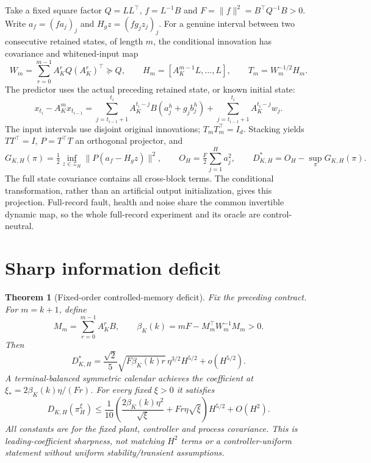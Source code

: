 \documentclass[11pt]{article}
\newtheorem{theorem}{Theorem}
\begin{document}
Take a fixed square factor $Q=LL^\top$, $f=L^{-1}B$ and
$F=\|f\|^2=B^\top Q^{-1}B>0$.
Write $a_f=(f a_j)_j$ and $H_gz=(f g_j z_j)_j$.
For a genuine interval between two consecutive retained states, of length $m$,
the conditional innovation has covariance and whitened-input map
\[
W_m=\sum_{r=0}^{m-1}A_K^rQ(A_K^r)^\top\succeq Q,\qquad
H_m=[A_K^{m-1}L,\ldots,L],\qquad T_m=W_m^{-1/2}H_m .
\]
The predictor uses the actual preceding retained state, or known initial state:
\[
x_{t_i}-A_K^m x_{t_{i-1}}
=\sum_{j=t_{i-1}+1}^{t_i}A_K^{t_i-j}B(a_j^h+g_jb_j^h)
+\sum_{j=t_{i-1}+1}^{t_i}A_K^{t_i-j}w_j .
\]
The input intervals use disjoint original innovations; $T_mT_m^\top=I_d$.
Stacking yields $TT^\top=I$, $P=T^\top T$ an orthogonal projector, and
\[
G_{K,H}(\pi)=\tfrac12\inf_{z\in\mathcal Z_H}\|P(a_f-H_gz)\|^2,\qquad
O_H=\tfrac F2\sum_{j=1}^H a_j^2,\qquad
D_{K,H}^*=O_H-\sup_\pi G_{K,H}(\pi).
\]
The full state covariance contains all cross-block terms. The conditional
transformation, rather than an artificial output initialization, gives this
projection. Full-record fault, health and noise share the common invertible
dynamic map, so the whole full-record experiment and its oracle are
control-neutral.

\section{Sharp information deficit}\begin{theorem}[Fixed-order controlled-memory deficit]\label{thm:main}
Fix the preceding contract. For $m=k+1$, define
\[
M_m=\sum_{r=0}^{m-1}A_K^rB,\qquad
\beta_K(k)=mF-M_m^\top W_m^{-1}M_m>0.
\]
Then
\begin{equation}\label{eq:sharp}
D_{K,H}^*=\frac{\sqrt2}{5}\sqrt{F\beta_K(k)r}\,\eta^{3/2}H^{5/2}
+o(H^{5/2}).
\end{equation}
A terminal-balanced symmetric calendar achieves the coefficient at
$\xi_*=2\beta_K(k)\eta/(Fr)$. For every fixed $\xi>0$ it satisfies
\begin{equation}\label{eq:upper}
D_{K,H}(\pi_H^\xi)\le\frac1{10}
\left(\frac{2\beta_K(k)\eta^2}{\sqrt\xi}+Fr\eta\sqrt\xi\right)H^{5/2}
+O(H^2).
\end{equation}
All constants are for the fixed plant, controller and process covariance.
This is leading-coefficient sharpness, not matching $H^2$ terms or a
controller-uniform statement without uniform stability/transient assumptions.
\end{theorem}
\end{document}

